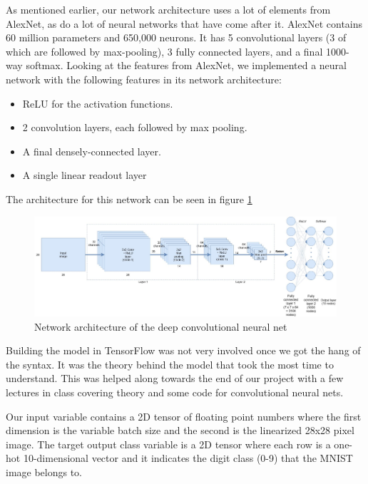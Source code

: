 \documentclass{article}
\begin{document}
As mentioned earlier, our network architecture uses a lot of elements from AlexNet, as do a lot of neural networks that have come after it. AlexNet contains 60 million parameters and 650,000 neurons. It has 5 convolutional layers (3 of which are followed by max-pooling), 3 fully connected layers, and a final 1000-way softmax. Looking at the features from AlexNet, we implemented a neural network with the following features in its network architecture:
\begin{itemize}
	\item ReLU for the activation functions.
    \item 2 convolution layers, each followed by max pooling.
    \item A final densely-connected layer.
    \item A single linear readout layer 
\end{itemize}
The architecture for this network can be seen in figure \ref{fig:mnist-deepcnn-architecture}

\begin{figure}[h]
	\centering
	\includegraphics[width=\textwidth]{mnist-deepcnn-architecture.png}
    \caption{Network architecture of the deep convolutional neural net}
    \label{fig:mnist-deepcnn-architecture}
\end{figure}

Building the model in TensorFlow was not very involved once we got the hang of the syntax. It was the theory behind the model that took the most time to understand. This was helped along towards the end of our project with a few lectures in class covering theory and some code for convolutional neural nets. 

Our input variable contains a 2D tensor of floating point numbers where the first dimension is the variable batch size and the second is the linearized 28x28 pixel image. The target output class variable is a 2D tensor where each row is a one-hot 10-dimensional vector and it indicates the digit class (0-9) that the MNIST image belongs to.

\end{document}
